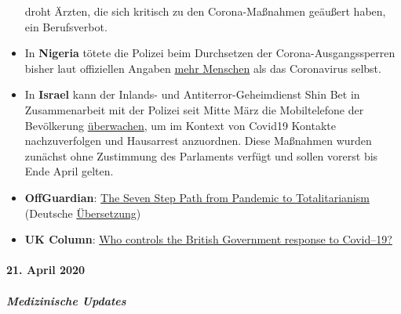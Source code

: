 \begin{itemize}
  droht Ärzten, die sich kritisch zu den Corona-Maßnahmen geäußert
  haben, ein Berufsverbot.
\item
  In \textbf{Nigeria} tötete die Polizei beim Durchsetzen der
  Corona-Ausgangssperren bisher laut offiziellen Angaben
  \href{https://www.bbc.com/news/world-africa-52317196}{mehr Menschen}
  als das Coronavirus selbst.
\item
  In \textbf{Israel} kann der Inlands- und Antiterror-Geheimdienst Shin
  Bet in Zusammenarbeit mit der Polizei seit Mitte März die
  Mobiltelefone der Bevölkerung
  \href{https://www.jewishpress.com/news/the-courts/state-to-high-court-even-more-shin-bet-involvement-in-fighting-the-coronavirus/2020/04/14/}{überwachen},
  um im Kontext von Covid19 Kontakte nachzuverfolgen und Hausarrest
  anzuordnen. Diese Maßnahmen wurden zunächst ohne Zustimmung des
  Parlaments verfügt und sollen vorerst bis Ende April gelten.
\item
  \textbf{OffGuardian}:
  \href{https://off-guardian.org/2020/04/23/the-seven-step-path-from-pandemic-to-totalitarianism/}{The
  Seven Step Path from Pandemic to Totalitarianism} (Deutsche
  \href{https://uncut-news.ch/wp-content/uploads/2020/04/In-sieben-Schritte-von-der-Pandemie-zum-Totalitarismus.pdf}{Übersetzung})
\item
  \textbf{UK Column}:
  \href{https://www.ukcolumn.org/article/who-controls-british-government-response-covid19-part-one}{Who
  controls the British Government response to Covid--19?}
\end{itemize}

\hypertarget{21-april-2020}{%
\paragraph{21. April 2020}\label{21-april-2020}}

\hypertarget{medizinische-updates-1}{%
\subparagraph{\texorpdfstring{\textbf{Medizinische
Updates}}{Medizinische Updates}}\label{medizinische-updates-1}}

